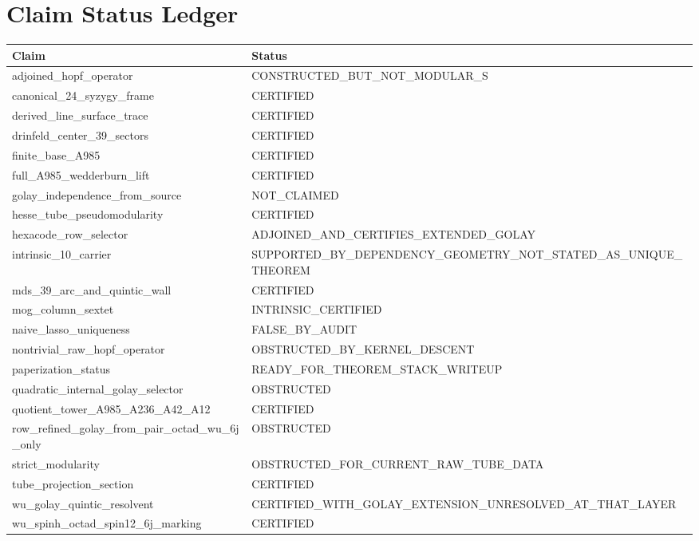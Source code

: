 \section*{Claim Status Ledger}
\begin{longtable}{ll}
\toprule
Claim & Status \\
\midrule
adjoined\_hopf\_operator & CONSTRUCTED\_BUT\_NOT\_MODULAR\_S \\
canonical\_24\_syzygy\_frame & CERTIFIED \\
derived\_line\_surface\_trace & CERTIFIED \\
drinfeld\_center\_39\_sectors & CERTIFIED \\
finite\_base\_A985 & CERTIFIED \\
full\_A985\_wedderburn\_lift & CERTIFIED \\
golay\_independence\_from\_source & NOT\_CLAIMED \\
hesse\_tube\_pseudomodularity & CERTIFIED \\
hexacode\_row\_selector & ADJOINED\_AND\_CERTIFIES\_EXTENDED\_GOLAY \\
intrinsic\_10\_carrier & SUPPORTED\_BY\_DEPENDENCY\_GEOMETRY\_NOT\_STATED\_AS\_UNIQUE\_THEOREM \\
mds\_39\_arc\_and\_quintic\_wall & CERTIFIED \\
mog\_column\_sextet & INTRINSIC\_CERTIFIED \\
naive\_lasso\_uniqueness & FALSE\_BY\_AUDIT \\
nontrivial\_raw\_hopf\_operator & OBSTRUCTED\_BY\_KERNEL\_DESCENT \\
paperization\_status & READY\_FOR\_THEOREM\_STACK\_WRITEUP \\
quadratic\_internal\_golay\_selector & OBSTRUCTED \\
quotient\_tower\_A985\_A236\_A42\_A12 & CERTIFIED \\
row\_refined\_golay\_from\_pair\_octad\_wu\_6j\_only & OBSTRUCTED \\
strict\_modularity & OBSTRUCTED\_FOR\_CURRENT\_RAW\_TUBE\_DATA \\
tube\_projection\_section & CERTIFIED \\
wu\_golay\_quintic\_resolvent & CERTIFIED\_WITH\_GOLAY\_EXTENSION\_UNRESOLVED\_AT\_THAT\_LAYER \\
wu\_spinh\_octad\_spin12\_6j\_marking & CERTIFIED \\
\bottomrule
\end{longtable}
